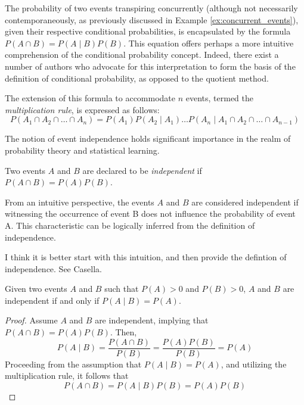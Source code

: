 The probability of two events transpiring concurrently (although not necessarily contemporaneously, as previously discussed in Example \ref{ex:concurrent_events}), given their respective conditional probabilities, is encapsulated by the formula $P \left( A \cap B \right) = P \left( A \mid B \right) P \left( B \right)$. This equation offers perhaps a more intuitive comprehension of the conditional probability concept. Indeed, there exist a number of authors who advocate for this interpretation to form the basis of the definition of conditional probability, as opposed to the quotient method.

The extension of this formula to accommodate $n$ events, termed the \emph{multiplication rule}, is expressed as follows:
\begin{equation}\label{eq:multiplication_rule}
P \left( A_{1} \cap A_{2} \cap \ldots \cap A_{n} \right) = P \left( A_{1} \right) P \left( A_{2} \mid A_{1}\right) \ldots  P \left( A_{n} \mid A_{1}\cap A_{2} \cap \ldots \cap A_{n-1} \right)
\end{equation}

The notion of event independence holds significant importance in the realm of probability theory and statistical learning. 

\begin{definition}\label{independent_events}
Two events $A$ and $B$ are declared to be \emph{independent} if $P \left( A \cap B \right) = P \left( A \right) P \left(B \right)$.
\end{definition}

From an intuitive perspective, the events $A$ and $B$ are considered independent if witnessing the occurrence of event B does not influence the probability of event A. This characteristic can be logically inferred from the definition of independence.

{\color{red} I think it is better start with this intuition, and then provide the defintion of independence. See Casella.}

\begin{proposition}
Given two events $A$ and $B$ such that $P \left( A \right) > 0$ and $P \left( B \right)>0$, $A$ and $B$ are independent if and only if $P \left( A \mid B\right) = P \left( A \right)$.
\end{proposition}
\begin{proof}
Assume $A$ and $B$ are independent, implying that $P \left( A \cap B \right) = P \left( A \right) P \left(B \right)$. Then,
\[
P \left( A \mid B \right) = \frac{P\left(A\cap B\right)}{P\left(B\right)} = \frac{P \left( A \right) P \left(B \right)}{P\left(B\right)} = P \left( A \right)
\]
Proceeding from the assumption that $P \left( A \mid B \right) = P \left( A \right)$, and utilizing the multiplication rule, it follows that
\[
P \left( A \cap B \right) =  P \left( A \mid B \right) P \left( B \right) = P \left( A \right) P \left( B \right)
\]
\end{proof}

